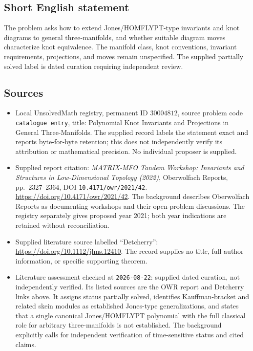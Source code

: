 \documentclass[11pt]{article}
\begin{document}
\subsection{Short English statement}
The problem asks how to extend Jones/HOMFLYPT-type invariants and knot diagrams to general three-manifolds, and whether suitable diagram moves characterize knot equivalence. The manifold class, knot conventions, invariant requirements, projections, and moves remain unspecified. The supplied partially solved label is dated curation requiring independent review.
\subsection{Sources}
\begin{itemize}
\item Local UnsolvedMath registry, permanent ID \(30004812\), source problem code \texttt{catalogue entry}, title: Polynomial Knot Invariants and Projections in General Three-Manifolds. The supplied record labels the statement exact and reports byte-for-byte retention; this does not independently verify its attribution or mathematical precision. No individual proposer is supplied.
\item Supplied report citation: \emph{MATRIX-MFO Tandem Workshop: Invariants and Structures in Low-Dimensional Topology (2022)}, Oberwolfach Reports, pp.\ 2327--2364, DOI \texttt{10.4171/owr/2021/42}. \url{https://doi.org/10.4171/owr/2021/42}. The background describes Oberwolfach Reports as documenting workshops and their open-problem discussions. The registry separately gives proposed year 2021; both year indications are retained without reconciliation.
\item Supplied literature source labelled ``Detcherry'': \url{https://doi.org/10.1112/jlms.12410}. The record supplies no title, full author information, or specific supporting theorem.
\item Literature assessment checked at \texttt{2026-08-22}: supplied dated curation, not independently verified. Its listed sources are the OWR report and Detcherry links above. It assigns status partially solved, identifies Kauffman-bracket and related skein modules as established Jones-type generalizations, and states that a single canonical Jones/HOMFLYPT polynomial with the full classical role for arbitrary three-manifolds is not established. The background explicitly calls for independent verification of time-sensitive status and cited claims.
\end{itemize}
\end{document}
